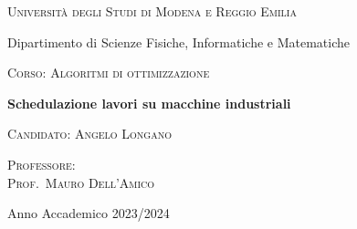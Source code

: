 
\begin{titlepage}
    \centering
    {\scshape\LARGE Università degli Studi di Modena e Reggio Emilia \par}
    \vspace{0.5cm}
    {\Large Dipartimento di Scienze Fisiche, Informatiche e Matematiche\par}
    \vspace{1cm}
    {\scshape\Large Corso: Algoritmi di ottimizzazione\par}
    \vspace{0.5cm}
    {\huge\bfseries Schedulazione lavori su macchine industriali\par}
    \vspace{1.5cm}
    {\Large\scshape Candidato: Angelo Longano \par}
    \vspace{0.5cm}
    \vfill
    {\scshape Professore: \\
        Prof.~Mauro Dell'Amico }
    \vfill
    \vspace{1.5cm}
    { Anno Accademico 2023/2024\par}
\end{titlepage}

